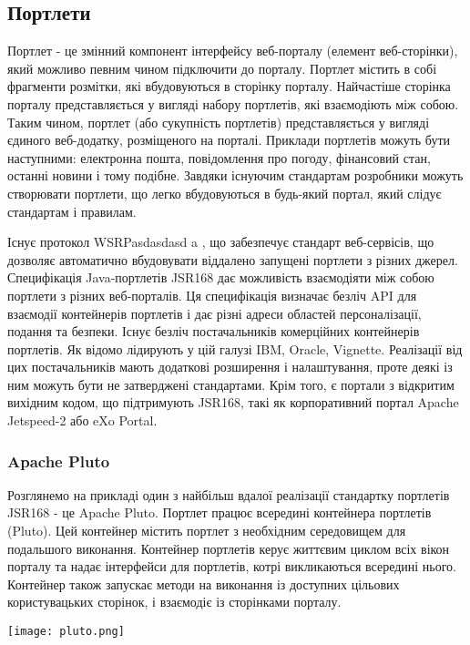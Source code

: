 \subsection{Портлети}
Портлет - це змінний компонент інтерфейсу веб-порталу (елемент веб-сторінки), який можливо певним чином підключити до порталу.
Портлет містить в собі фрагменти розмітки, які вбудовуються в сторінку порталу. 
Найчастіше сторінка порталу представляється у вигляді набору портлетів, які взаємодіють між собою. 
Таким чином, портлет (або сукупність портлетів) представляється у вигляді єдиного веб-додатку, розміщеного на порталі. 
Приклади портлетів можуть бути наступними: електронна пошта, повідомлення про погоду, фінансовий стан, останні новини і тому подібне.
Завдяки існуючим стандартам розробники можуть створювати портлети, що легко вбудовуються в будь-який портал, який слідує стандартам і правилам.
\par Існує протокол WSRPasdasdasd a , що забезпечує стандарт веб-сервісів, що дозволяє автоматично вбудовувати віддалено запущені портлети з різних джерел.
Специфікація Java-портлетів JSR168 дає можливість взаємодіяти між собою портлети з різних веб-порталів. 
Ця специфікація визначає безліч API для взаємодії контейнерів портлетів і дає різні адреси областей персоналізації, подання та безпеки.
Існує безліч постачальників комерційних контейнерів портлетів. 
Як відомо лідирують у цій галузі IBM, Oracle, Vignette. 
Реалізації від цих постачальників мають додаткові розширення і налаштування, проте деякі із ним можуть бути не затверджені стандартами. 
Крім того, є портали з відкритим вихідним кодом, що підтримують JSR168, такі як корпоративний портал Apache Jetspeed-2 або eXo Portal.
\subsubsection{Apache Pluto}
Розглянемо на прикладі один з найбільш вдалої реалізації стандартку портлетів JSR168 - це Apache Pluto.
Портлет працює всередині контейнера портлетів (Pluto).
Цей контейнер містить портлет з необхідним середовищем для подальшого виконання.
Контейнер портлетів керує життєвим циклом всіх вікон порталу та надає інтерфейси для портлетів, котрі викликаються всередині нього.
Контейнер також запускає методи на виконання із доступних цільових користувацьких сторінок, і взаємодіє із сторінками порталу.

        \begin{center}
		\texttt{[image: pluto.png]}
	\end{center}

